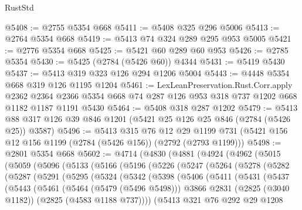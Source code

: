 \begin{lexlean}{RustStd}
\begin{coremodule}
@5408 := @2755 @5354 @668
@5411 := @5408 @325 @296 @5006
@5413 := @2764 @5354 @668
@5419 := @5413 @74 @324 @289 @295 @953 @5005
@5421 := @2776 @5354 @668
@5425 := @5421 @60 @289 @60 @953
@5426 := @2785 @5354
@5430 := @5425 (@2784 (@5426 @60)) @4344
@5431 := @5419 @5430
@5437 := @5413 @319 @323 @126 @294 @1206 @5004
@5443 := @4448 @5354 @668 @319 @126 @1195 @1204
@5461 := LexLeanPreservation.Rust.Corr.apply
    @2362
    @2364
    @2366
    @5354
    @668
    @74
    @287
    @126
    @953
    @318
    @737
    @1202
    @668
    @1182
    @1187
    @1191
    @5430
@5464 := @5408 @318 @287 @1202
@5479 := @5413 @88 @317 @126 @39 @846 @1201 (@5421 @25 @126 @25 @846 (@2784 (@5426 @25)) @3587)
@5496 := @5413
    @315
    @76
    @12
    @29
    @1199
    @731
    (@5421 @156 @12 @156 @1199 (@2784 (@5426 @156)) (@2792 (@2793 @1199)))
@5498 := @2801 @5354 @668
@5602 := @4714
    (@4830
      (@4881
        (@4924
          (@4962
            (@5015
              (@5059
                (@5096
                  (@5133
                    (@5166
                      (@5196
                        (@5226
                          (@5247
                            (@5264
                              (@5278
                                (@5282
                                  (@5287
                                    (@5291
                                      (@5295
                                        (@5324
                                          (@5342
                                            (@5398
                                              (@5406
                                                (@5411
                                                  (@5431
                                                    (@5437
                                                      (@5443
                                                        (@5461
                                                          (@5464 (@5479 (@5496 @5498)))
                                                          @3866
                                                          @2831
                                                          (@2825 (@3040 @1182))
                                                          (@2825 (@4583 @1188 @737))))
                                                      (@5413
                                                        @321
                                                        @76
                                                        @292
                                                        @29
                                                        @1208

\end{coremodule}
\end{lexlean}
